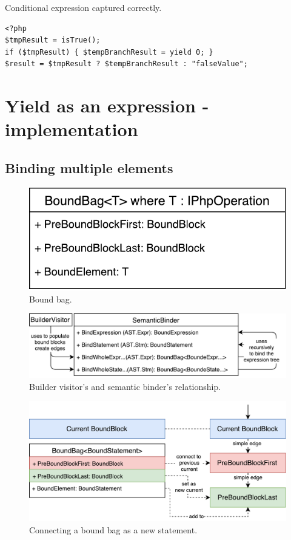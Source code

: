 \begin{listing}[H]
\caption{Conditional expression captured correctly.}
\label{list5.3:CondCorrect}
\begin{verbatim}
<?php
$tmpResult = isTrue();
if ($tmpResult) { $tempBranchResult = yield 0; }
$result = $tmpResult ? $tempBranchResult : "falseValue";
\end{verbatim}
\end{listing}

\section{Yield as an expression - implementation}

\subsection{Binding multiple elements}

\begin{figure}[h]
	\centering	
	\includegraphics[scale=0.75]{../img/5_3_BoundBag}	
	\caption{Bound bag.}
	\label{fig5.3:BoundBag}
\end{figure}

\begin{figure}[h]
	\centering	
	\includegraphics[scale=0.75]{../img/5_3_BoundWholeExpression}	
	\caption{Builder visitor's and semantic binder's relationship.}
	\label{fig5.3:BindWholeExpr}
\end{figure}

\begin{figure}[h]
	\centering	
	\includegraphics[scale=0.75]{../img/5_3_newStatement}	
	\caption{Connecting a bound bag as a new statement.}
	\label{fig5.3:BindNewStm}
\end{figure}


